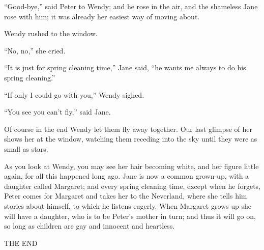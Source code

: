 ``Good-bye,'' said Peter to Wendy; and he rose in the air, and the
shameless Jane rose with him; it was already her easiest way of moving
about.

Wendy rushed to the window.

``No, no,'' she cried.

``It is just for spring cleaning time,'' Jane said, ``he wants me always
to do his spring cleaning.''

``If only I could go with you,'' Wendy sighed.

``You see you can't fly,'' said Jane.

Of course in the end Wendy let them fly away together. Our last glimpse
of her shows her at the window, watching them receding into the sky
until they were as small as stars.

As you look at Wendy, you may see her hair becoming white, and her
figure little again, for all this happened long ago. Jane is now a
common grown-up, with a daughter called Margaret; and every spring
cleaning time, except when he forgets, Peter comes for Margaret and
takes her to the Neverland, where she tells him stories about himself,
to which he listens eagerly. When Margaret grows up she will have a
daughter, who is to be Peter's mother in turn; and thus it will go on,
so long as children are gay and innocent and heartless.

\begin{center}
\huge
THE END
\end{center}
